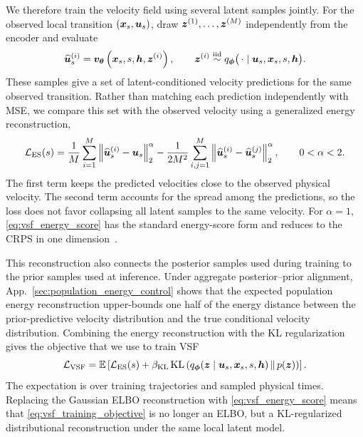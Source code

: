 We therefore train the velocity field using several latent samples jointly.
For the observed local transition $({\bm{x}}_s,{\bm{u}}_s)$, draw
${\bm{z}}^{(1)},\ldots,{\bm{z}}^{(M)}$ independently from the encoder and evaluate
\begin{equation}
\widehat{{\bm{u}}}_s^{(i)}
=
{\bm{v}}_{{\bm{\theta}}}
\left(
{\bm{x}}_s,s,{\bm{h}},{\bm{z}}^{(i)}
\right),
\qquad
{\bm{z}}^{(i)}
\stackrel{\mathrm{iid}}{\sim}
q_{\boldsymbol{\phi}}
\bigl(
\,\cdot\mid
{\bm{u}}_s,{\bm{x}}_s,s,{\bm{h}}
\bigr).
\label{eq:posterior_velocity_samples}
\end{equation}
These samples give a set of latent-conditioned velocity predictions for the
same observed transition. Rather than matching each prediction independently
with MSE, we compare this set with the observed velocity using a generalized
energy reconstruction,
\begin{equation}
\mathcal L_{\mathrm{ES}}(s)
=
\frac{1}{M}
\sum_{i=1}^{M}
\left\|
\widehat{{\bm{u}}}_s^{(i)}-{\bm{u}}_s
\right\|_2^\alpha
-
\frac{1}{2M^2}
\sum_{i,j=1}^{M}
\left\|
\widehat{{\bm{u}}}_s^{(i)}
-
\widehat{{\bm{u}}}_s^{(j)}
\right\|_2^\alpha,
\qquad
0<\alpha<2.
\label{eq:vsf_energy_score}
\end{equation}
The first term keeps the predicted velocities close to the observed physical
velocity. The second term accounts for the spread among the predictions, so
the loss does not favor collapsing all latent samples to the same velocity.
For $\alpha=1$, \cref{eq:vsf_energy_score} has the standard energy-score
form and reduces to the CRPS in one dimension~\citep{gneiting2007strictly, lang2026aifs}.

This reconstruction also connects the posterior samples used during training
to the prior samples used at inference. Under aggregate posterior--prior
alignment, App.~\ref{sec:population_energy_control} shows that the expected
population energy reconstruction upper-bounds one half of the energy distance
between the prior-predictive velocity distribution and the true conditional
velocity distribution.
%
Combining the energy reconstruction with the KL regularization gives the objective that we use to train VSF
%
\begin{equation}
\mathcal L_{\mathrm{VSF}}
=
\mathbb E
\left[
\mathcal L_{\mathrm{ES}}(s)
+
\beta_{\mathrm{KL}}
\operatorname{KL}
\left(
q_{\boldsymbol{\phi}}
({\bm{z}}\mid{\bm{u}}_s,{\bm{x}}_s,s,{\bm{h}})
\,\Vert\,
p({\bm{z}})
\right)
\right].
\label{eq:vsf_training_objective}
\end{equation}
%
The expectation is over training trajectories and sampled physical times.
Replacing the Gaussian ELBO reconstruction with
\cref{eq:vsf_energy_score} means that
\cref{eq:vsf_training_objective} is no longer an ELBO, but a KL-regularized
distributional reconstruction under the same local latent model.



